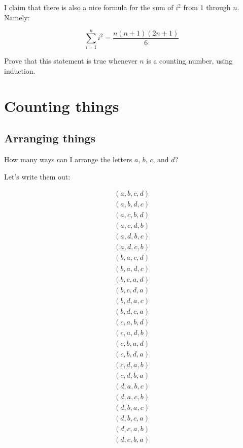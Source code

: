 
\begin{exercise}
\label{sum-i2}
I claim that there is also a nice formula for the sum of $i^2$ from 1 through $n$. Namely:

\begin{equation}
\label{eq:sum-i2}
\sum_{i=1}^{n} i^2 = \frac{n(n+1)(2n+1)}{6}
\end{equation}

Prove that this statement is true whenever $n$ is a counting number, using induction.
\end{exercise}


\section{Counting things}




\subsection{Arranging things}


How many ways can I arrange the letters $a$, $b$, $c$, and $d$?

Let's write them out:

\begin{gather*}
(a, b, c, d) \\
(a, b, d, c) \\
(a, c, b, d) \\
(a, c, d, b) \\
(a, d, b, c) \\
(a, d, c, b) \\
(b, a, c, d) \\
(b, a, d, c) \\
(b, c, a, d) \\
(b, c, d, a) \\
(b, d, a, c) \\
(b, d, c, a) \\
(c, a, b, d) \\
(c, a, d, b) \\
(c, b, a, d) \\
(c, b, d, a) \\
(c, d, a, b) \\
(c, d, b, a) \\
(d, a, b, c) \\
(d, a, c, b) \\
(d, b, a, c) \\
(d, b, c, a) \\
(d, c, a, b) \\
(d, c, b, a) \\
\end{gather*}

